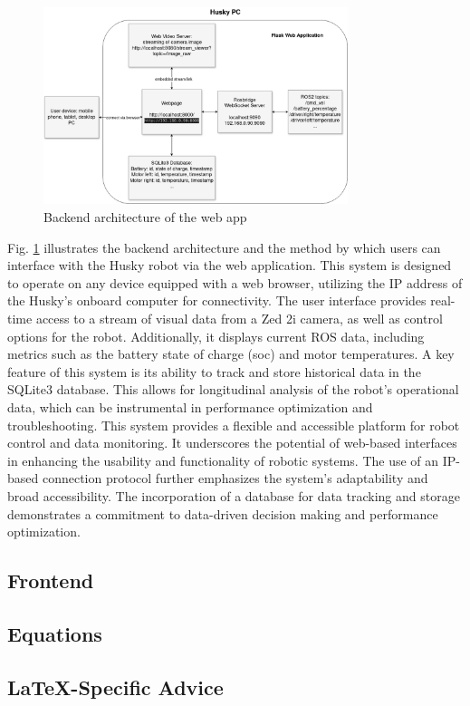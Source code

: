 \documentclass[conference]{IEEEtran}
\begin{document}
\begin{figure}[htbp]
    \centerline{\includegraphics[width=8.9cm]{Pictures/userapp.png}}
    \caption{Backend architecture of the web app}
    \label{fig:userapp}
\end{figure}
Fig. \ref{fig:userapp} illustrates the backend architecture and the method by which users can interface with the Husky robot via the web application. This system is designed to operate on any device equipped with a web browser, utilizing the IP address of the Husky's onboard computer for connectivity.
The user interface provides real-time access to a stream of visual data from a Zed 2i camera, as well as control options for the robot. Additionally, it displays current ROS data, including metrics such as the battery state of charge (soc) and motor temperatures.
A key feature of this system is its ability to track and store historical data in the SQLite3 database. This allows for longitudinal analysis of the robot's operational data, which can be instrumental in performance optimization and troubleshooting.
This system provides a flexible and accessible platform for robot control and data monitoring. It underscores the potential of web-based interfaces in enhancing the usability and functionality of robotic systems. 
The use of an IP-based connection protocol further emphasizes the system's adaptability and broad accessibility. The incorporation of a database for data tracking and storage demonstrates a commitment to data-driven decision making and performance optimization. 
\subsection{Frontend}


\subsection{Equations}

\subsection{\LaTeX-Specific Advice}
\end{document}
